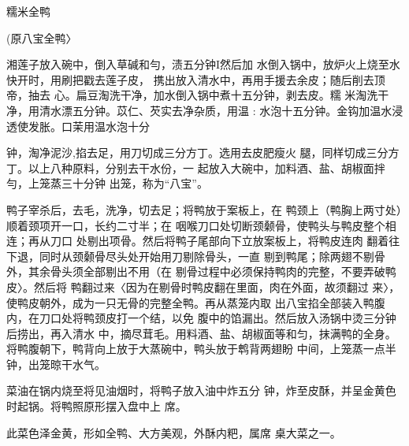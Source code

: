 \begin{recipe}{糯米全鸭}

(原八宝全鸭〉

\ingredients


\cooking

湘莲子放入碗中，倒入草碱和勻，渍五分钟I然后加 水倒入锅中，放炉火上烧至水快开时，用刷把戳去莲子皮， 携出放入清水中，再用手援去余皮；随后削去顶帝，抽去 心。扁豆淘洗干净，加水倒入锅中煮十五分钟，剥去皮。糯 米淘洗干净，用清水漂五分钟。苡仁、芡实去净杂质，用温 : 水泡十五分钟。金钩加温水浸透使发胀。口茉用温水泡十分

钟，淘净泥沙,掐去足，用刀切成三分方丁。选用去皮肥瘦火 腿，同样切成三分方丁。以上八种原料，分别去干水份，一 起放入大碗中，加料酒、盐、胡椒面拌勻，上笼蒸三十分钟 出笼，称为“八宝”。

\step 	鸭子宰杀后，去毛，洗净，切去足；将鸭放于案板上，在 鸭颈上（鸭胸上两寸处）顺着颈项开一口，长约二寸半；在 咽喉刀口处切断颈颡骨，使鸭头与鸭皮整个相连；再从刀口 处剔出项骨。然后将鸭子尾部向下立放案板上，将鸭皮连肉 翻着往下退，同时从颈颡骨尽头处开始用刀剔除骨头，一直 剔到鸭尾；除两翅不剔骨外，其余骨头须全部剔出不用（在 剔骨过程中必须保持鸭肉的完整，不要弄破鸭皮〉。然后将 鸭翻过来〈因为在剔骨时鸭皮翻在里面，肉在外面，故须翻过 来〉，使鸭皮朝外，成为一只无骨的完整全鸭。再从蒸笼内取 出八宝掐全部装入鸭腹内，在刀口处将鸭颈皮打一个结，以免 腹中的馅漏出。然后放入汤锅中烫三分钟后捞出，再入清水 中，摘尽茸毛。用料酒、盐、胡椒面等和匀，抹满鸭的全身。 将鸭腹朝下，鸭背向上放于大蒸碗中，鸭头放于鹎背两翅盼 中间，上笼蒸一点半钟，出笼晾干水气。

\step 	菜油在锅内烧至将见油烟时，将鸭子放入油中炸五分 钟，炸至皮酥，并呈金黄色时起锅。将鸭照原形摆入盘中上 席。

\notes

此菜色泽金黄，形如全鸭、大方美观，外酥内粑，属席 桌大菜之一。

\end{recipe}

